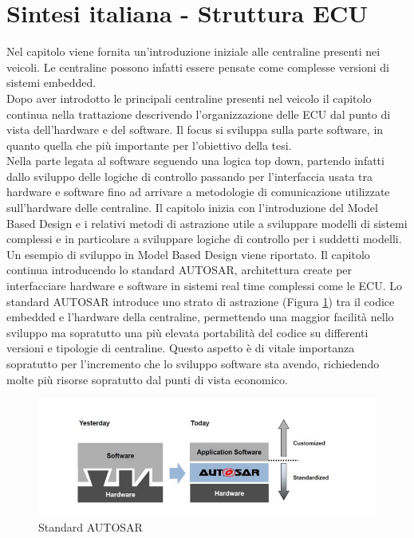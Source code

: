 \documentclass[../main.tex]{subfiles}
\begin{document}
\section{Sintesi italiana - Struttura ECU}
Nel capitolo viene fornita un'introduzione iniziale alle centraline presenti nei veicoli. Le centraline possono infatti essere pensate come complesse versioni di sistemi embedded.\\
Dopo aver introdotto le principali centraline presenti nel veicolo il capitolo continua nella trattazione descrivendo l'organizzazione delle \gls{ECU} dal punto di vista dell'hardware e del software. Il focus si sviluppa sulla parte software, in quanto quella che più importante per l'obiettivo della tesi.\\
Nella parte legata al software seguendo una logica top down, partendo infatti dallo sviluppo delle logiche di controllo passando per l'interfaccia usata tra hardware e software fino ad arrivare a metodologie di comunicazione utilizzate sull'hardware delle centraline. Il capitolo inizia con l'introduzione del Model Based Design  e i relativi metodi di astrazione utile a sviluppare modelli di sistemi complessi e in particolare a sviluppare logiche di controllo per i suddetti modelli. Un esempio di sviluppo in Model Based Design viene riportato. Il capitolo continua introducendo lo standard \gls{AUTOSAR}, architettura create per interfacciare hardware e software in sistemi real time complessi come le \gls{ECU}. Lo standard \gls{AUTOSAR} introduce uno strato di astrazione (Figura \ref{fig:autosar}) tra il codice embedded e l'hardware della centraline, permettendo una maggior facilità nello sviluppo ma sopratutto una più elevata portabilità del codice su differenti versioni e tipologie di centraline. Questo aspetto è di vitale importanza sopratutto per l'incremento che lo sviluppo software sta avendo, richiedendo molte più risorse sopratutto dal punti di vista economico.
\begin{figure}[h]
    \centering
    \includegraphics[width=\linewidth]{images_folder/autosarcapture.jpg}
    \caption{Standard AUTOSAR}
    \label{fig:autosar}
\end{figure}
\end{document}
